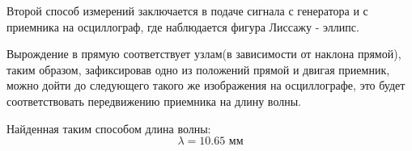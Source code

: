 Второй способ измерений заключается в подаче сигнала с генератора и с приемника на осциллограф, где наблюдается фигура Лиссажу - эллипс. 

Вырождение в прямую соответствует узлам(в зависимости от наклона прямой), таким образом, зафиксировав одно из положений прямой и двигая приемник, можно дойти до следующего такого же изображения на осциллографе, это будет соответствовать передвижению приемника на длину волны.

Найденная таким способом длина волны:
\begin{equation}
	\lambda=10.65 \text{ мм}
\end{equation}



 